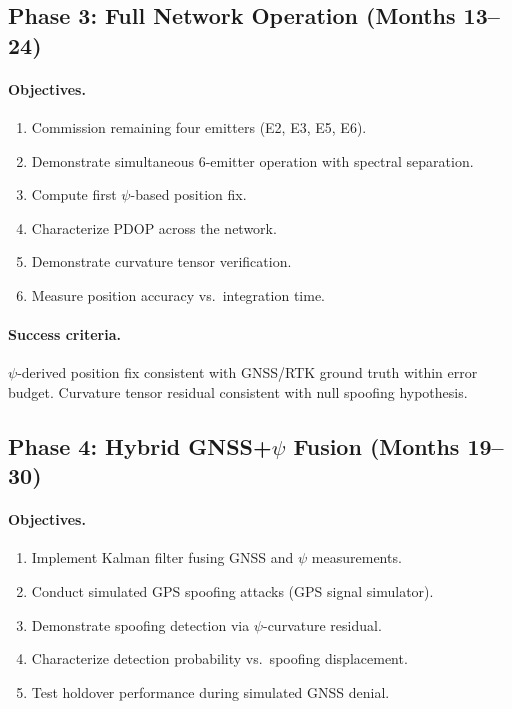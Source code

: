 \documentclass[11pt,a4paper]{article}
\begin{document}
\subsection{Phase 3: Full Network Operation (Months 13--24)}

\paragraph{Objectives.}
\begin{enumerate}
\item Commission remaining four emitters (E2, E3, E5, E6).
\item Demonstrate simultaneous 6-emitter operation with spectral separation.
\item Compute first $\psi$-based position fix.
\item Characterize PDOP across the network.
\item Demonstrate curvature tensor verification.
\item Measure position accuracy vs.\ integration time.
\end{enumerate}

\paragraph{Success criteria.}
$\psi$-derived position fix consistent with GNSS/RTK ground truth within
error budget. Curvature tensor residual consistent with null spoofing
hypothesis.

\subsection{Phase 4: Hybrid GNSS+$\psi$ Fusion (Months 19--30)}

\paragraph{Objectives.}
\begin{enumerate}
\item Implement Kalman filter fusing GNSS and $\psi$ measurements.
\item Conduct simulated GPS spoofing attacks (GPS signal simulator).
\item Demonstrate spoofing detection via $\psi$-curvature residual.
\item Characterize detection probability vs.\ spoofing displacement.
\item Test holdover performance during simulated GNSS denial.
\end{enumerate}
\end{document}
